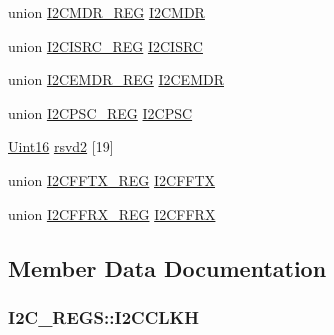 \begin{DoxyCompactItemize}
\item 
union \hyperlink{union_i2_c_m_d_r___r_e_g}{I2\+C\+M\+D\+R\+\_\+\+R\+E\+G} \hyperlink{struct_i2_c___r_e_g_s_a5aecafbae128f79217bd3ccee6fc9b63}{I2\+C\+M\+D\+R}
\item 
union \hyperlink{union_i2_c_i_s_r_c___r_e_g}{I2\+C\+I\+S\+R\+C\+\_\+\+R\+E\+G} \hyperlink{struct_i2_c___r_e_g_s_a0f57d9034567b71cd6ee82512ced3ae4}{I2\+C\+I\+S\+R\+C}
\item 
union \hyperlink{union_i2_c_e_m_d_r___r_e_g}{I2\+C\+E\+M\+D\+R\+\_\+\+R\+E\+G} \hyperlink{struct_i2_c___r_e_g_s_a310af971665412225866a1339a3c8e68}{I2\+C\+E\+M\+D\+R}
\item 
union \hyperlink{union_i2_c_p_s_c___r_e_g}{I2\+C\+P\+S\+C\+\_\+\+R\+E\+G} \hyperlink{struct_i2_c___r_e_g_s_a557e1617b1357bbaa7645d6c7489ce04}{I2\+C\+P\+S\+C}
\item 
\hyperlink{_d_s_p2833x___device_8h_a59a9f6be4562c327cbfb4f7e8e18f08b}{Uint16} \hyperlink{struct_i2_c___r_e_g_s_ab3e4a800c7b96a9c722fcd85accafd74}{rsvd2} \mbox{[}19\mbox{]}
\item 
union \hyperlink{union_i2_c_f_f_t_x___r_e_g}{I2\+C\+F\+F\+T\+X\+\_\+\+R\+E\+G} \hyperlink{struct_i2_c___r_e_g_s_a7c0c6d1fc9e253982cd34474ff0365bd}{I2\+C\+F\+F\+T\+X}
\item 
union \hyperlink{union_i2_c_f_f_r_x___r_e_g}{I2\+C\+F\+F\+R\+X\+\_\+\+R\+E\+G} \hyperlink{struct_i2_c___r_e_g_s_a42da692b5086399e905af9be393a573c}{I2\+C\+F\+F\+R\+X}
\end{DoxyCompactItemize}


\subsection{Member Data Documentation}
\hypertarget{struct_i2_c___r_e_g_s_ac0196dccce8ca9b880cd05b5d7a45cd3}{}
\subsubsection[{I2\+C\+C\+L\+K\+H}]{ I2\+C\+\_\+\+R\+E\+G\+S\+::\+I2\+C\+C\+L\+K\+H}\label{struct_i2_c___r_e_g_s_ac0196dccce8ca9b880cd05b5d7a45cd3}
\hypertarget{struct_i2_c___r_e_g_s_a8c144771bfe69298b5e7f6dd167263b5}{}
